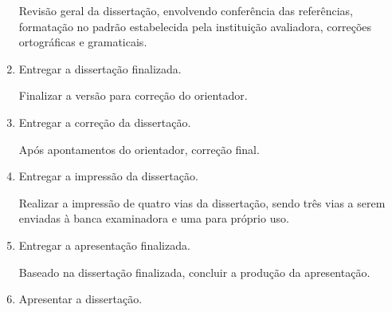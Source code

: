 \begin{enumerate}
Revisão geral da dissertação, envolvendo conferência das referências, formatação no padrão estabelecida pela instituição avaliadora, correções ortográficas e gramaticais.

  \item \label{finalizar}   Entregar a dissertação finalizada.

Finalizar a versão para correção do orientador.

  \item \label{corrigir}    Entregar a correção da dissertação.

Após apontamentos do orientador, correção final.

  \item \label{imprimir}    Entregar a impressão da dissertação.

Realizar a impressão de quatro vias da dissertação, sendo três vias a serem  enviadas à banca examinadora e uma para próprio uso.

  \item \label{finalApres}  Entregar a apresentação finalizada.

Baseado na dissertação finalizada, concluir a produção da apresentação.

  \item \label{apresentar}  Apresentar a dissertação.

\end{enumerate}


